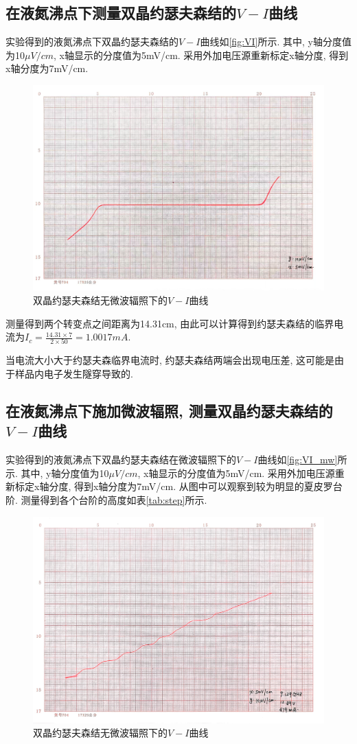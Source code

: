 \documentclass[font=default]{mpltx}
\begin{document}
  \subsection{在液氮沸点下测量双晶约瑟夫森结的$V-I$曲线}
  实验得到的液氮沸点下双晶约瑟夫森结的$V-I$曲线如\autoref{fig:VI}所示. 其中, y轴分度值为10$\mu V/cm$, x轴显示的分度值为5mV/cm.
  采用外加电压源重新标定x轴分度, 得到x轴分度为7mV/cm.
   \begin{figure}
    \centering
    \includegraphics[width=0.85\linewidth]{fig/4.jpg}
    \caption{双晶约瑟夫森结无微波辐照下的$V-I$曲线}
    \label{fig:VI}
  \end{figure}

  测量得到两个转变点之间距离为14.31cm, 由此可以计算得到约瑟夫森结的临界电流为$I_c=\frac{14.31\times 7}{2\times 50}=1.0017mA$.

  \par
  当电流大小大于约瑟夫森临界电流时, 约瑟夫森结两端会出现电压差, 这可能是由于样品内电子发生隧穿导致的.

  \subsection{在液氮沸点下施加微波辐照, 测量双晶约瑟夫森结的$V-I$曲线}
  实验得到的液氮沸点下双晶约瑟夫森结在微波辐照下的$V-I$曲线如\autoref{fig:VI_mw}所示. 其中, y轴分度值为10$\mu V/cm$, x轴显示的分度值为5mV/cm.
  采用外加电压源重新标定x轴分度, 得到x轴分度为7mV/cm.
  从图中可以观察到较为明显的夏皮罗台阶.
  测量得到各个台阶的高度如表\ref{tab:step}所示.
  \begin{figure}
      \centering
      \includegraphics[width=0.85\linewidth]{fig/5.jpg}
      \caption{双晶约瑟夫森结无微波辐照下的$V-I$曲线}
      \label{fig:VI_mw}
    \end{figure}
  
\end{document}
